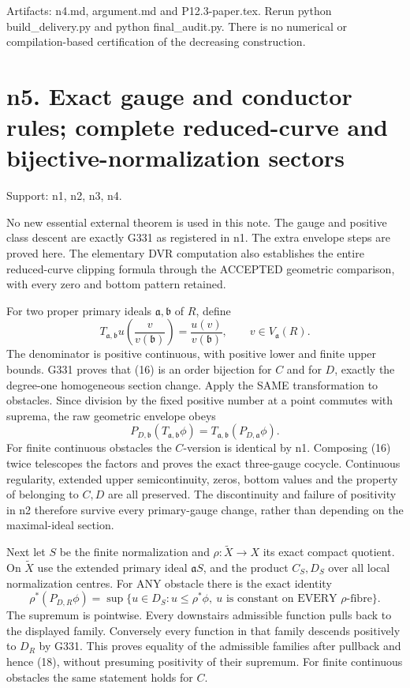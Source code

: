 \documentclass[11pt]{article}
\begin{document}
Artifacts: n4.md, argument.md and P12.3-paper.tex. Rerun python build\_delivery.py and python final\_audit.py. There is no numerical or compilation-based certification of the decreasing construction.

\section{n5. Exact gauge and conductor rules; complete reduced-curve and bijective-normalization sectors}

Support: n1, n2, n3, n4.

No new essential external theorem is used in this note. The gauge and positive class descent are exactly G331 as registered in n1. The extra envelope steps are proved here. The elementary DVR computation also establishes the entire reduced-curve clipping formula through the ACCEPTED geometric comparison, with every zero and bottom pattern retained.

For two proper primary ideals \(\mathfrak a,\mathfrak b\) of \(R\), define
\[
T_{\mathfrak a,\mathfrak b}u\left(\frac{v}{v(\mathfrak b)}\right)
=\frac{u(v)}{v(\mathfrak b)},\qquad v\in V_{\mathfrak a}(R). \tag{16}
\]
The denominator is positive continuous, with positive lower and finite upper bounds. G331 proves that (16) is an order bijection for \(C\) and for \(D\), exactly the degree-one homogeneous section change. Apply the SAME transformation to obstacles. Since division by the fixed positive number at a point commutes with suprema, the raw geometric envelope obeys
\[
P_{D,\mathfrak b}(T_{\mathfrak a,\mathfrak b}\phi)
=T_{\mathfrak a,\mathfrak b}(P_{D,\mathfrak a}\phi). \tag{17}
\]
For finite continuous obstacles the \(C\)-version is identical by n1. Composing (16) twice telescopes the factors and proves the exact three-gauge cocycle. Continuous regularity, extended upper semicontinuity, zeros, bottom values and the property of belonging to \(C,D\) are all preserved. The discontinuity and failure of positivity in n2 therefore survive every primary-gauge change, rather than depending on the maximal-ideal section.

Next let \(S\) be the finite normalization and \(\rho:\widetilde X\to X\) its exact compact quotient. On \(\widetilde X\) use the extended primary ideal \(\mathfrak aS\), and the product \(C_S,D_S\) over all local normalization centres. For ANY obstacle there is the exact identity
\[
\rho^*(P_{D,R}\phi)
=\sup\{u\in D_S:u\le\rho^*\phi,\ 
u\text{ is constant on EVERY }\rho\text{-fibre}\}. \tag{18}
\]
The supremum is pointwise. Every downstairs admissible function pulls back to the displayed family. Conversely every function in that family descends positively to \(D_R\) by G331. This proves equality of the admissible families after pullback and hence (18), without presuming positivity of their supremum. For finite continuous obstacles the same statement holds for \(C\).
\end{document}
